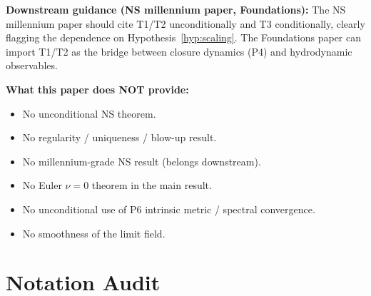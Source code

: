 \documentclass[11pt, a4paper]{amsart}
\theoremstyle{definition}
\begin{document}
\textbf{Downstream guidance (NS millennium paper, Foundations):}
The NS millennium paper should cite T1/T2 unconditionally and
T3 conditionally, clearly flagging the dependence on
Hypothesis~\ref{hyp:scaling}. The Foundations paper can import
T1/T2 as the bridge between closure dynamics (P4) and
hydrodynamic observables.

\textbf{What this paper does NOT provide:}
\begin{itemize}
\item No unconditional NS theorem.
\item No regularity / uniqueness / blow-up result.
\item No millennium-grade NS result (belongs downstream).
\item No Euler $\nu = 0$ theorem in the main result.
\item No unconditional use of P6 intrinsic metric / spectral
  convergence.
\item No smoothness of the limit field.
\end{itemize}

\section{Notation Audit}
\label{sec:notation}
\end{document}
